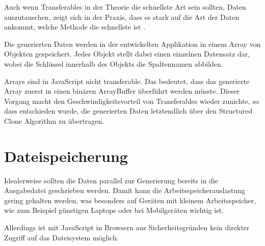 Auch wenn Transferables in der Theorie die schnellste Art sein sollten, Daten auszutauschen, zeigt sich in der Praxis, dass es stark auf die Art der Daten ankommt, welche Methode die schnellste ist \cite{transferables1, transferables2, transferables3}.

Die generierten Daten werden in der entwickelten Applikation in einem Array von Objekten gespeichert. Jedes Objekt stellt dabei einen einzelnen Datensatz dar, wobei die Schlüssel innerhalb des Objekts die Spaltennamen abbilden.

Arrays sind in JavaScript nicht transferable. Das bedeutet, dass das generierte Array zuerst in einen binären ArrayBuffer überführt werden müsste. Dieser Vorgang macht den Geschwindigkeitsvorteil von Transferables wieder zunichte, so dass entschieden wurde, die generierten Daten letztendlich über den Structured Clone Algorithm zu übertragen.

\section{Dateispeicherung}

Idealerweise sollten die Daten parallel zur Generierung bereits in die Ausgabedatei geschrieben werden. Damit kann die Arbeitsspeicherauslastung gering gehalten werden, was besonders auf Geräten mit kleinem Arbeitsspeicher, wie zum Beispiel günstigen Laptops oder bei Mobilgeräten wichtig ist.

Allerdings ist mit JavaScript in Browsern aus Sicherheitsgründen kein direkter Zugriff auf das Dateisystem möglich. 

